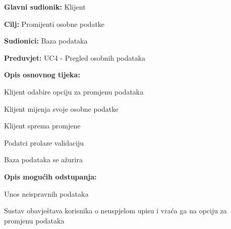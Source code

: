 					\noindent {}
					\begin{packed_item}
	
						\item \textbf{Glavni sudionik: } Klijent
						\item  \textbf{Cilj:} Promijenti osobne podatke
						\item  \textbf{Sudionici:} Baza podataka
						\item  \textbf{Preduvjet:} UC4 - Pregled osobnih podataka
						\item  \textbf{Opis osnovnog tijeka:}
						
						\item[] \begin{packed_enum}
						
							\item Klijent odabire opciju za promjenu podataka
							\item Klijent mijenja svoje osobne podatke
							\item Klijent sprema promjene
							\item Podatci prolaze validaciju
							\item Baza podataka se ažurira
							
						\end{packed_enum}
						
						\item  \textbf{Opis mogućih odstupanja:}
						
						\item[] \begin{packed_item}
	
							\item[2.a] Unos neispravnih podataka
							\item[] \begin{packed_enum}
								
								\item Sustav obavještava korisnika o neuspjelom upisu i vraća ga
								na opciju za promjenu podataka
								
							\end{packed_enum}
						\end{packed_item}
					\end{packed_item}

